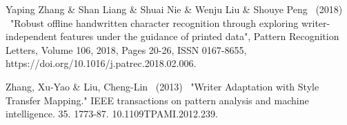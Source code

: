 \documentclass{article}
\begin{document}
\begin{thebibliography}{99}
   Yaping Zhang \& Shan Liang \& Shuai Nie \& Wenju Liu \& Shouye Peng \ (2018) \ "Robust offline handwritten character recognition through exploring writer-independent features under the guidance of printed data", Pattern Recognition Letters, Volume 106, 2018, Pages 20-26, ISSN 0167-8655, https://doi.org/10.1016/j.patrec.2018.02.006.

   Zhang, Xu-Yao \& Liu, Cheng-Lin \ (2013) \ "Writer Adaptation with Style Transfer Mapping." IEEE transactions on pattern analysis and machine intelligence. 35. 1773-87. 10.1109\/TPAMI.2012.239. 
\end{thebibliography}
\end{document}
